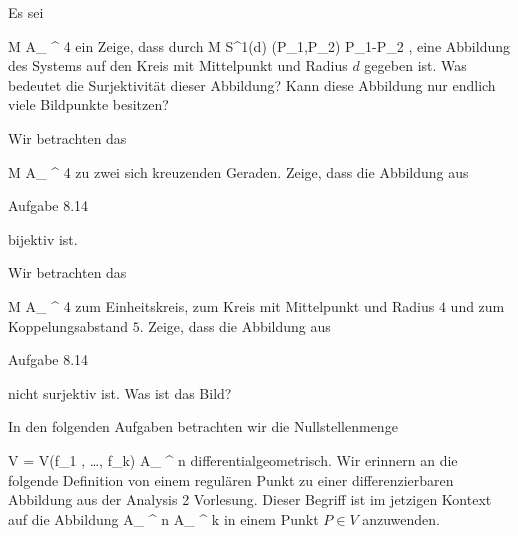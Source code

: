 {}
{





Es sei

\mavergleichskette
{\vergleichskette
{ M
}
{ \subset }{ { {\mathbb A}_{ \R }^{  4   } }
}
{  }{
}
{    }{
}
{   }{}
}
{}{}{}
ein
Zeige, dass durch
\maabbeledisp {} { M } { S^1(d)
} {(P_1,P_2)} { P_1-P_2
} {,}
eine Abbildung des Systems auf den Kreis mit Mittelpunkt
 und Radius $d$ gegeben ist. Was bedeutet die Surjektivität dieser Abbildung? Kann diese Abbildung nur endlich viele Bildpunkte besitzen?





}
{} {}

{}
{





Wir betrachten das

\mavergleichskette
{\vergleichskette
{M
}
{ \subset }{ { {\mathbb A}_{ \R }^{  4   } }
}
{  }{
}
{    }{
}
{   }{
}
}
{}{}{}
zu zwei sich kreuzenden Geraden. Zeige, dass die Abbildung aus

Aufgabe 8.14

bijektiv ist.





}
{} {}

{}
{





Wir betrachten das

\mavergleichskette
{\vergleichskette
{M
}
{ \subset }{ { {\mathbb A}_{ \R }^{  4   } }
}
{  }{
}
{    }{
}
{   }{
}
}
{}{}{}
zum Einheitskreis, zum Kreis mit Mittelpunkt
 und Radius $4$ und zum Koppelungsabstand $5$. Zeige, dass die Abbildung aus

Aufgabe 8.14

nicht surjektiv ist. Was ist das Bild?





}
{} {}

In den folgenden Aufgaben betrachten wir die Nullstellenmenge

\mavergleichskettedisp
{\vergleichskette
{V
}
{ =} { V(f_1  , \ldots , f_k)
}
{ \subset} {  { {\mathbb A}_{ \R }^{ n  } }
}
{ } {
}
{ } {
}
}
{}{}{}
differentialgeometrisch. Wir erinnern an die folgende Definition von einem regulären Punkt zu einer differenzierbaren Abbildung aus der Analysis 2 Vorlesung. Dieser Begriff ist im jetzigen Kontext auf die Abbildung
 {{ {\mathbb A}_{ \R }^{ n  } }  } {{ {\mathbb A}_{ \R }^{ k  } }
} {}
in einem Punkt $P \in V$ anzuwenden.








